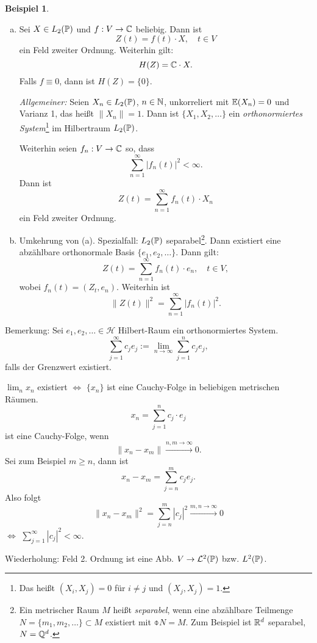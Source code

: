 \documentclass[
 a4paper,
 12pt,
 parskip=half
 ]{scrreprt}
\theoremstyle{plain}
\theoremstyle{definition}
\newtheorem{exmp}[thm]{Beispiel}
\numberwithin{equation}{section}
\begin{document}
\begin{exmp}
  \begin{enumerate}[(a)]
  \item Sei $X \in L_2(\mathbb{P})$ und $f: V \to \mathbb{C}$ beliebig. Dann ist
    \[ Z(t) = f(t) \cdot X, \quad t \in V \]
    ein Feld zweiter Ordnung. Weiterhin gilt:
    \[ H(Z) = \mathbb{C} \cdot X. \]
    Falls $f \equiv 0$, dann ist $H(Z) = \{0\}$.

    \emph{Allgemeiner:} Seien $X_n \in L_2(\mathbb{P})$, $n \in \mathbb{N}$, unkorreliert mit
    $\mathbb{E}(X_n) = 0$ und Varianz 1, das heißt $\| X_n \| = 1$. Dann ist $\{X_1,
    X_2, \ldots \}$ ein \emph{orthonormiertes System}\footnote{%
      Das heißt $(X_i, X_j) = 0$ für $i \ne j$ und $(X_j, X_j) = 1$.
    } im Hilbertraum $L_2(\mathbb{P})$.

    Weiterhin seien $f_n : V \to \mathbb{C}$ so, dass
    \[ \sum_{n=1}^\infty |f_n(t)|^2 < \infty. \]
    Dann ist
    \[ Z(t) = \sum_{n=1}^\infty f_n(t) \cdot X_n \]
    ein Feld zweiter Ordnung.
  \item Umkehrung von (a). Spezialfall: $L_2(\mathbb{P})$ separabel\footnote{%
      Ein metrischer Raum $M$ heißt \emph{separabel}, wenn eine abzählbare
      Teilmenge $N = \{m_1, m_2, \ldots \} \subset M$ existiert mit $\obar{N} =
      M$. Zum Beispiel ist $\mathbb{R}^d$ separabel, $N = \mathbb{Q}^d$.
    }. Dann existiert eine abzählbare orthonormale Basis
    $\{ e_1, e_2, \ldots \}$. Dann gilt:
    \[ Z(t) = \sum_{n=1}^\infty f_n(t) \cdot e_n, \quad t \in V, \]
    wobei $f_n(t) = (Z_t, e_n)$. Weiterhin ist
    \[ \| Z(t) \|^2 = \sum_{n=1}^\infty | f_n(t) |^2. \]
  \end{enumerate}
\end{exmp}

Bemerkung:
Sei $e_1, e_2, \ldots \in \mathcal{H}$ Hilbert-Raum ein orthonormiertes
System.
\[ \sum_{j=1}^\infty c_j e_j := \lim_{n \to \infty} \sum_{j=1}^n c_j e_j, \]
falls der Grenzwert existiert.

$\lim_n x_n$ existiert $\Leftrightarrow$ $\{ x_n\}$ ist eine Cauchy-Folge in
beliebigen metrischen Räumen.
\[ x_n = \sum_{j=1}^n c_j \cdot e_j \]
ist eine Cauchy-Folge, wenn
\[ \| x_n - x_m \| \xrightarrow{n,m \to \infty} 0. \]
Sei zum Beispiel $m \ge n$, dann ist
\[ x_n - x_m = \sum_{j=n}^m c_j e_j. \]
Also folgt
\[ \| x_n - x_m \|^2 = \sum_{j=n}^m |c_j|^2 \xrightarrow{m,n \to \infty}
  0 \]
$\Leftrightarrow$ $\sum_{j=1}^\infty |c_j|^2 < \infty$.

Wiederholung:
Feld 2. Ordnung ist eine Abb. $V \to \mathcal{L}^2(\mathbb{P})$ bzw. $L^2(\mathbb{P})$.
\end{document}
